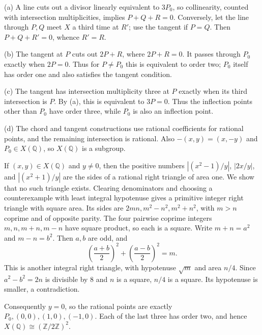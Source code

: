 (a) A line cuts out a divisor linearly equivalent to $3P_0$, so collinearity, counted with intersection multiplicities, implies $P+Q+R=0$. Conversely, let the line through $P,Q$ meet $X$ a third time at $R'$; use the tangent if $P=Q$. Then $P+Q+R'=0$, whence $R'=R$.

(b) The tangent at $P$ cuts out $2P+R$, where $2P+R=0$. It passes through $P_0$ exactly when $2P=0$. Thus for $P\neq P_0$ this is equivalent to order two; $P_0$ itself has order one and also satisfies the tangent condition.

(c) The tangent has intersection multiplicity three at $P$ exactly when its third intersection is $P$. By (a), this is equivalent to $3P=0$. Thus the inflection points other than $P_0$ have order three, while $P_0$ is also an inflection point.

(d) The chord and tangent constructions use rational coefficients for rational points, and the remaining intersection is rational. Also $-(x,y)=(x,-y)$ and $P_0\in X(\mathbb Q)$, so $X(\mathbb Q)$ is a subgroup.

If $(x,y)\in X(\mathbb Q)$ and $y\neq0$, then the positive numbers $|(x^2-1)/y|$, $|2x/y|$, and $|(x^2+1)/y|$ are the sides of a rational right triangle of area one. We show that no such triangle exists. Clearing denominators and choosing a counterexample with least integral hypotenuse gives a primitive integer right triangle with square area. Its sides are $2mn,m^2-n^2,m^2+n^2$, with $m>n$ coprime and of opposite parity. The four pairwise coprime integers $m,n,m+n,m-n$ have square product, so each is a square. Write $m+n=a^2$ and $m-n=b^2$. Then $a,b$ are odd, and
\[\left(\frac{a+b}{2}\right)^2+\left(\frac{a-b}{2}\right)^2=m.\]
This is another integral right triangle, with hypotenuse $\sqrt m$ and area $n/4$. Since $a^2-b^2=2n$ is divisible by $8$ and $n$ is a square, $n/4$ is a square. Its hypotenuse is smaller, a contradiction.

Consequently $y=0$, so the rational points are exactly $P_0,(0,0),(1,0),(-1,0)$. Each of the last three has order two, and hence $X(\mathbb Q)\cong(\mathbb Z/2\mathbb Z)^2$.
